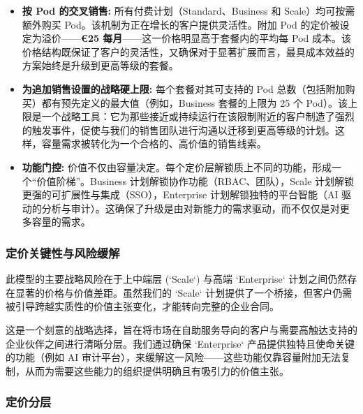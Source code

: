 \documentclass[11pt, a4paper, oneside]{article}
\begin{document}
\begin{itemize}
    \item \textbf{按 Pod 的交叉销售:} 所有付费计划（Standard、Business 和 Scale）均可按需额外购买 Pod。该机制为正在增长的客户提供灵活性。附加 Pod 的定价被设定为溢价——\textbf{\euro{25} 每月}——这一价格明显高于套餐内的平均每 Pod 成本。该价格结构既保证了客户的灵活性，又确保对于显著扩展而言，最具成本效益的方案始终是升级到更高等级的套餐。

    \item \textbf{为追加销售设置的战略硬上限:} 每个套餐对其可支持的 Pod 总数（包括附加购买）都有预先定义的最大值（例如，Business 套餐的上限为 25 个 Pod）。该上限是一个战略工具：它为那些接近或持续运行在该限制附近的客户制造了强烈的触发事件，促使与我们的销售团队进行沟通以迁移到更高等级的计划。这样，容量需求被转化为一个合格的、高价值的销售线索。

    \item \textbf{功能门控:} 价值不仅由容量决定。每个定价层解锁质上不同的功能，形成一个“价值阶梯”。Business 计划解锁协作功能（RBAC、团队），Scale 计划解锁更强的可扩展性与集成（SSO），Enterprise 计划解锁独特的平台智能（AI 驱动的分析与审计）。这确保了升级是由对新能力的需求驱动，而不仅仅是对更多容量的需求。
\end{itemize}

\subsubsection{定价关键性与风险缓解}

此模型的主要战略风险在于上中端层 (`Scale`) 与高端 `Enterprise` 计划之间仍然存在显著的价格与价值差距。虽然我们的 `Scale` 计划提供了一个桥接，但客户仍需被引导跨越实质性的价值主张变化，才能转向完整的企业合同。

这是一个刻意的战略选择，旨在将市场在自助服务导向的客户与需要高触达支持的企业伙伴之间进行清晰分层。我们通过确保 `Enterprise` 产品提供独特且使命关键的功能（例如 AI 审计平台），来缓解这一风险——这些功能仅靠容量附加无法复制，从而为需要这些能力的组织提供明确且有吸引力的价值主张。

\subsubsection{定价分层}
\end{document}
